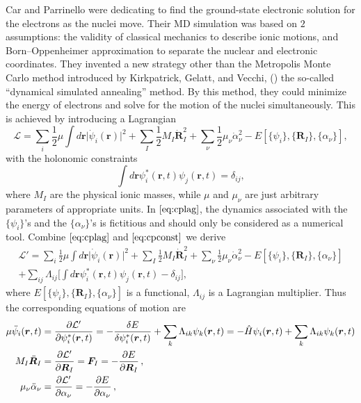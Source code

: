 Car and Parrinello were dedicating to find the ground-state electronic
solution for the electrons as the nuclei move. Their MD simulation was
based on $2$ assumptions: the validity of classical mechanics to describe
ionic motions, and Born--Oppenheimer approximation to separate the
nuclear and electronic coordinates.
They invented a new strategy other than the Metropolis Monte Carlo method
introduced by Kirkpatrick, Gelatt, and Vecchi, (\cite{Kirkpatrick:1983zz})
the so-called ``dynamical simulated annealing'' method.
By this method, they could minimize the energy of electrons and solve
for the motion of the nuclei simultaneously. This is achieved by introducing
a Lagrangian
\begin{equation}\label{eq:cplag}
	\mathcal{L} = \sum_{i} \frac{ 1 }{ 2 } \mu \int d\bm{r} \lvert
	\dot{\psi}_i(\bm{r}) \rvert ^ 2 +
	\sum_{I} \frac{ 1 }{ 2 } M_I \dot{ \bm{R} }_I ^ 2 +
	\sum_{\nu} \frac{ 1 }{ 2 } \mu_{\nu}  \dot{ \alpha }_\nu ^ 2 -
	E[\{ \psi_i \}, \{ \bm{R}_I \}, \{ \alpha_\nu \}],
\end{equation}
with the holonomic constraints
\begin{equation}\label{eq:cpconst}
	\int d\bm{r} \psi_i ^ \ast (\bm{r}, t) \psi_j (\bm{r}, t) = \delta_{ij},
\end{equation}
where $M_I$ are the physical ionic masses, while $\mu$ and $\mu_{\nu}$
are just arbitrary parameters of appropriate units.
In $\eqref{eq:cplag}$,
the dynamics associated with the $\{ \psi_i \}$'s and
the $\{ \alpha_\nu \}$'s is fictitious and should only be considered
as a numerical tool.
Combine
$\eqref{eq:cplag}$ and $\eqref{eq:cpconst}$ we derive
\begin{multline}
	\mathcal{L}' =
	\sum_{i} \frac{ 1 }{ 2 } \mu \int d\bm{r} \lvert
	\dot{\psi}_i(\bm{r}) \rvert ^ 2 +
	\sum_{I} \frac{ 1 }{ 2 } M_I \dot{ \bm{R} }_I ^ 2 +
	\sum_{\nu} \frac{ 1 }{ 2 } \mu_{\nu}  \dot{ \alpha }_\nu ^ 2 -
	E[\{ \psi_i \}, \{ \bm{R}_I \}, \{ \alpha_\nu \}]\\
	+ \sum_{ij} \Lambda_{ij} \bigg[
		\int d\bm{r} \psi_i ^ \ast (\bm{r}, t) \psi_j (\bm{r}, t) - \delta_{ij}
		\bigg],
\end{multline}
where $E[\{ \psi_i \}, \{ \bm{R}_I \}, \{ \alpha_\nu \}]$ is a functional,
$\Lambda_{ij}$ is a Lagrangian multiplier.
Thus the corresponding equations of motion are
\begin{align}
	\mu \ddot{\psi}_i (\bm{r}, t) & =
	\frac{ \partial \mathcal{L}' }{ \partial \psi_i^\ast (\bm{r}, t)} = -
	\frac{ \delta E}{ \delta \psi_i^\ast (\bm{r}, t)} + \sum_{k}
	\Lambda_{ik} \psi_k (\bm{r}, t) =
	- \hat{H} \psi_i(\bm{r}, t) + \sum_{k}
	\Lambda_{ik} \psi_k (\bm{r}, t)\\
	M_I \ddot{\bm{R}}_I           & =
	\frac{ \partial \mathcal{L}' }{ \partial \bm{R}_I } =
	\bm{F}_{I} =
	- \frac{ \partial E }{ \partial \bm{R}_I } \thinspace,\\
	\mu_{\nu} \ddot{\alpha}_{\nu} & =
	\frac{ \partial \mathcal{L}' }{ \partial \alpha_{\nu} } =
	- \frac{ \partial E }{ \partial \alpha_{\nu} } \thinspace,
\end{align}

